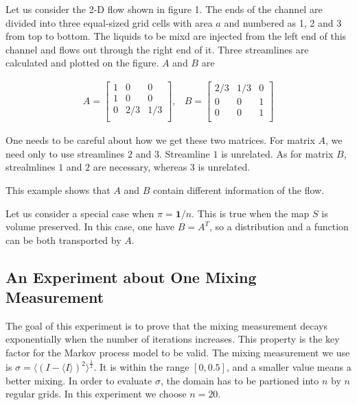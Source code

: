 \begin{example} 
Let us consider the 2-D flow shown in figure 1. The ends of the channel are divided into three equal-sized grid cells with area $a$ and numbered as 1, 2 and 3 from top to bottom. The liquids to be mixd are injected from the left end of this channel and flows out through the right end of it. Three streamlines are calculated and plotted on the figure. $A$ and $B$ are

  \begin{eqnarray*}
     A = \left[\begin{matrix}
          1 & 0 & 0 \\
          1 & 0 & 0 \\
          0 & 2/3 & 1/3\\ 
         \end{matrix}\right], & 
     B = \left[\begin{matrix}
          2/3 & 1/3 & 0 \\
          0 & 0 & 1 \\
          0 & 0 & 1\\ 
         \end{matrix}\right]
  \end{eqnarray*}  

One needs to be careful about how we get these two matrices. For matrix $A$, we need only to use streamlines $2$ and $3$. Streamline $1$ is unrelated. As for matrix $B$, strealmlines $1$ and $2$ are necessary, whereas $3$ is unrelated. 

\end{example}

This example shows that $A$ and $B$ contain different information of the flow.    

\begin{example}
Let us consider a special case when $\pi = \mathbf{1}/n$. This is true when the map $S$ is volume preserved. In this case, one have $B = A^T$, so a distribution and a function can be both transported by $A$. 
\end{example}




\subsection{An Experiment about One Mixing Measurement}
The goal of this experiment is to prove that the mixing measurement decays exponentially when the number of iterations increases. This property is the key factor for the Markov process model to be valid. The mixing measurement we use is $\sigma= \langle(I-\langle I\rangle)^2\rangle^{\frac{1}{2}} $. It is within the range $[0,0.5]$, and a smaller value means a better mixing. In order to evaluate $\sigma$, the domain has to be partioned into $n$ by $n$ regular grids. In this experiment we choose $n=20$. 


